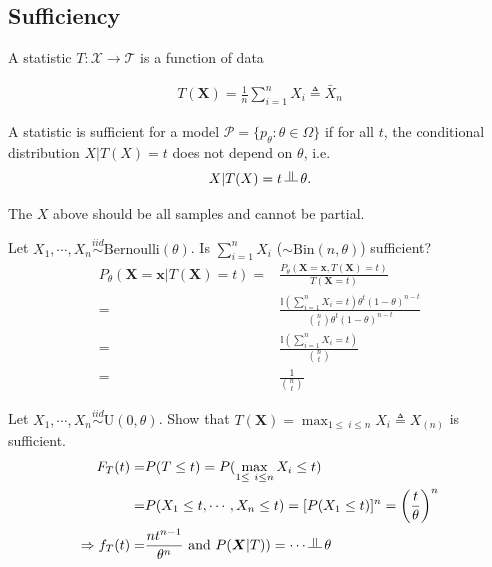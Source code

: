 \subsection{Sufficiency}
\begin{definition}[statistic]
    A statistic $T:\mathcal{X}\to \mathcal{T}$ is a function of data
\end{definition}

\begin{example}
    \begin{gather}
        T(\boldsymbol{X})=\frac{1}{n}\sum_{i=1}^n{X_i}\triangleq\bar{X}_n
    \end{gather}
\end{example}

\begin{definition}
    A statistic is sufficient for a model $\mathcal{P}=\{p_\theta:\theta\in\Omega\}$
    if for all $t$, the conditional distribution $X|T(X)=t$ does not depend on $\theta$, i.e. 
    \begin{gather}
        X|T(X)=t\vperp \theta.
    \end{gather}
\end{definition}

\begin{note}
    The $X$ above should be all samples and cannot be partial.
\end{note}

\begin{example}
    Let $X_1,\cdots,X_n\overset{iid}{\sim}\text{Bernoulli}(\theta)$.
    Is $\sum_{i=1}^n{X_i}$ ($\sim \text{Bin}(n,\theta)$) sufficient?
    \begin{align}
        P_\theta(\boldsymbol{X}=\boldsymbol{x}|T(\boldsymbol{X})=t)
        =&\frac{P_\theta(\boldsymbol{X}=\boldsymbol{x},T(\boldsymbol{X})=t)}{T(\boldsymbol{X}=t)}\\
        =&\frac{\mathbb{I}(\sum_{i=1}^n{X_i}=t)\theta^t(1-\theta)^{n-t}}{\binom{n}{t}\theta^t(1-\theta)^{n-t}}\\
        =&\frac{\mathbb{I}(\sum_{i=1}^n{X_i}=t)}{\binom{n}{t}}\\
        =&\frac{1}{\binom{n}{t}}
    \end{align}
\end{example}

\begin{example}
    Let $X_1,\cdots,X_n\overset{iid}{\sim}\text{U}(0,\theta)$. 
    Show that $T(\boldsymbol{X})=\max_{1\leq\ i\leq n}X_i\triangleq X_{(n)}$ is sufficient.
    \begin{align}
        F_T(t)=&P(T\leq t)=P(\max_{1\leq\ i\leq n}X_i\leq t)\\
        =&P(X_1\leq t,\cdots,X_n\leq t)=[P(X_1\leq t)]^n=\left(\frac{t}{\theta}\right)^n\\
        \Rightarrow
        f_T(t)=&\frac{nt^{n-1}}{\theta^n}~\text{and}~
        P(\boldsymbol{X}|T))=\cdots\vperp\theta
    \end{align}
\end{example}

